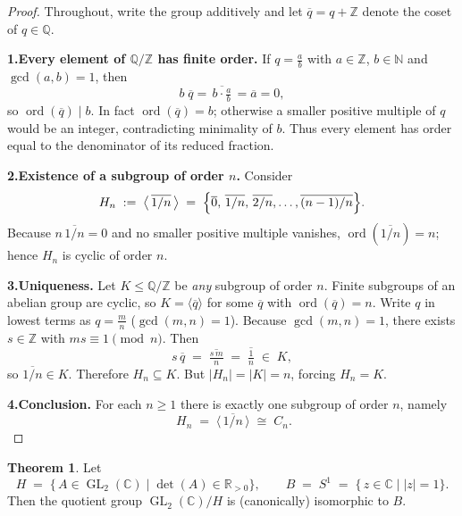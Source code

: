 \documentclass[12pt]{article}
\theoremstyle{definition} %
\newtheorem{theorem}{Theorem}
\theoremstyle{plain} %
\begin{document}
    \begin{proof}
    Throughout, write the group additively and let 
    \(\overline{q}=q+\mathbb{Z}\) denote the coset of \(q\in\mathbb{Q}\).
    
    \smallskip
    \textbf{1.\;Every element of \(\mathbb{Q}/\mathbb{Z}\) has finite order.}  
    If \(q=\tfrac ab\) with \(a\in\mathbb{Z}\), \(b\in\mathbb{N}\) and
    \(\gcd(a,b)=1\), then
    \[
       b\;\overline{q}= \overline{\,b\cdot\tfrac ab\,}= \overline{a}=0 ,
    \]
    so \(\operatorname{ord}(\overline{q})\mid b\).
    In fact \(\operatorname{ord}(\overline{q})=b\); otherwise a smaller
    positive multiple of \(q\) would be an integer, contradicting minimality
    of \(b\).
    Thus every element has order equal to the denominator of its reduced
    fraction.
    
    \smallskip
    \textbf{2.\;Existence of a subgroup of order \(n\).}  
    Consider
    \[
       H_{n}\;:=\;\bigl\langle\,\overline{1/n}\,\bigr\rangle
                \;=\;
                \Bigl\{
                   \overline{0},\,\overline{1/n},\,\overline{2/n},
                   \dots,\overline{(n-1)/n}
                \Bigr\}.
    \]
    Because \(n\,\overline{1/n}=0\) and no smaller positive multiple
    vanishes, \(\operatorname{ord}(\overline{1/n})=n\); hence \(H_{n}\)
    is cyclic of order \(n\).
    
    \smallskip
    \textbf{3.\;Uniqueness.}  
    Let \(K\le\mathbb{Q}/\mathbb{Z}\) be \emph{any} subgroup of order \(n\).
    Finite subgroups of an abelian group are cyclic, so
    \(K=\langle\overline{q}\rangle\) for some \(\overline{q}\) with
    \(\operatorname{ord}(\overline{q})=n\).
    Write \(q\) in lowest terms as \(q=\tfrac mn\) (\(\gcd(m,n)=1\)).
    Because \(\gcd(m,n)=1\), there exists \(s\in\mathbb{Z}\) with
    \(ms\equiv1\pmod{n}\).  Then
    \[
       s\,\overline{q}
         \;=\;
         \overline{\tfrac{s\,m}{n}}
         \;=\;
         \overline{\tfrac1n}\;\in\;K,
    \]
    so \(\overline{1/n}\in K\).  
    Therefore \(H_{n}\subseteq K\).
    But \(|H_{n}|=|K|=n\), forcing \(H_{n}=K\).
    
    \smallskip
    \textbf{4.\;Conclusion.}  
    For each \(n\ge1\) there is exactly one subgroup of order \(n\), namely
    \[
       \boxed{\;
         H_{n}\;=\;
         \bigl\langle\,\overline{1/n}\,\bigr\rangle
         \;\cong\;
         C_{n}}.
    \]
    \end{proof}
    \begin{theorem}
      Let
      \[
         H \;=\; \bigl\{\,A\in\operatorname{GL}_{2}(\mathbb{C})
                    \;\big|\;
                    \det(A)\in\mathbb{R}_{>0}\bigr\}, 
         \qquad
         B \;=\; S^{1}
              \;=\;\bigl\{\,z\in\mathbb{C}\;\big|\;|z|=1\bigr\}.
      \]
      Then the quotient group
      \(\operatorname{GL}_{2}(\mathbb{C})/H\) is (canonically) isomorphic to
      \(B\).
      \end{theorem}
      
\end{document}
